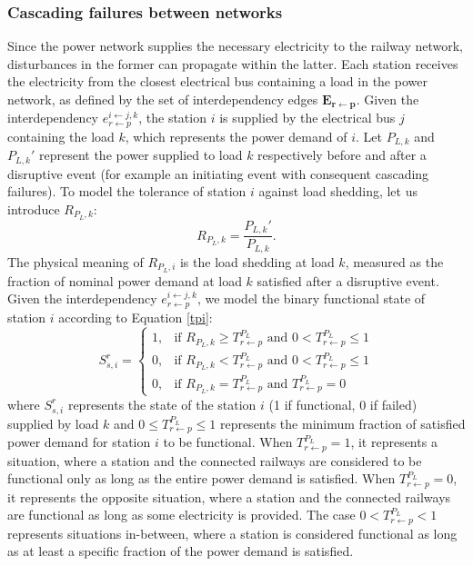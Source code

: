 \documentclass[review]{elsarticle}
\begin{document}
\subsubsection{Cascading failures between networks}

Since the power network supplies the necessary electricity to the railway network, disturbances in the former can propagate within the latter. Each station receives the electricity from the closest electrical bus containing a load in the power network, as defined by the set of interdependency edges $\mathbf{E_{r \leftarrow p}}$. Given the interdependency $e_{r \leftarrow p}^{i \leftarrow j,k}$, the station $i$ is supplied by the electrical bus $j$ containing the load $k$, which represents the power demand of $i$. Let $P_{L,k}$ and $P_{L,k}'$ represent the power supplied to load $k$ respectively before and after a disruptive event (for example an initiating event with consequent cascading failures). To model the tolerance of station $i$ against load shedding, let us introduce $R_{P_L,k}$: 
\begin{equation}
    R_{P_L,k} = \frac{P_{L,k}'}{P_{L,k}}.
    \label{ratio_pl}
\end{equation}
The physical meaning of $R_{P_L,i}$ is the load shedding at load $k$, measured as the fraction of nominal power demand at load $k$ satisfied after a disruptive event. Given the interdependency $e_{r \leftarrow p}^{i \leftarrow j,k}$, we model the binary functional state of station $i$ according to Equation \eqref{tpi}:
\begin{equation}
 S^r_{s,i} =
  \begin{cases}
    1, & \text{if $R_{P_L,k} \ge T_{r \leftarrow p}^{P_L}$ and $0<T_{r \leftarrow p}^{P_L}\leq 1$} \\
    0, & \text{if $R_{P_L,k}<T_{r \leftarrow p}^{P_L}$ and $0<T_{r \leftarrow p}^{P_L}\leq 1$} \\
    0, & \text{if $R_{P_L,k}=T_{r \leftarrow p}^{P_L}$ and $T_{r \leftarrow p}^{P_L}=0$}
  \end{cases}
  \label{tpi}
\end{equation}
where $S^r_{s,i}$ represents the state of the station $i$ (1 if functional, 0 if failed) supplied by load $k$ and $0 \le T_{r \leftarrow p}^{P_L} \le 1$ represents the minimum fraction of satisfied power demand for station $i$ to be functional. When $T_{r \leftarrow p}^{P_L}=1$, it represents a  situation, where a station and the connected railways are considered to be functional only as long as the entire power demand is satisfied. When $T_{r \leftarrow p}^{P_L}=0$, it represents the opposite situation, where a station and the connected railways are functional as long as some electricity is provided. The case $0 < T_{r \leftarrow p}^{P_L} < 1$ represents situations in-between, where a station is considered functional as long as at least a specific fraction of the power demand is satisfied.
\end{document}
